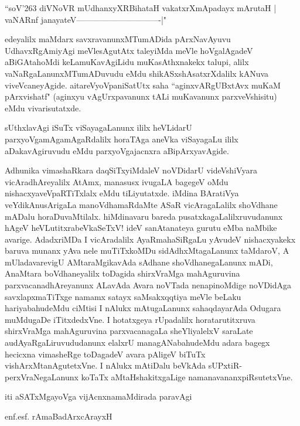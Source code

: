 \begin{shloka}
``soV\char'263 diVNoVR mUdhanxyXRBihataH vakatxrXmApadayx mArutaH |\\
vaNARnf janayateV-------------------------------|"
\end{shloka}

edeyalilx maMdarx savxravanunxMTumADida pArxNavAyuvu UdhavxRgAmiyAgi meVlesAgutAtx taleyiMda meVle hoVgalAgadeV aBiGAtahoMdi keLamuKavAgiLidu muKasAthxnakekx talupi, alilx vaNaRgaLanunxMTumADuvudu eMdu shikASxshAsatxrXdalilx kANuva viveVcaneyAgide. aitareVyoVpaniSatUtx saha ``aginxvARgUBxtAvx muKaM pArxvishatf" (aginxyu vAgUrxpavanunx tALi muKavanunx parxveVshisitu) eMdu vivarisutatxde.

sUthxlavAgi iSuTx viSayagaLanunx ililx heVLidarU parxyoVgamAgamAgaRdalilx horaTAga aneVka viSayagaLu ililx aDakavAgiruvudu eMdu parxyoVgajacnxra aBipArxyavAgide.

Adhunika vimashaRkara daqSiTxyiMdaleV noVDidarU videVshiVyara vicAradhAreyalilx AtAmx, manasusx ivugaLA bagegeV oMdu nishacxyaveVpaRTiTxlalx eMdu tiLiyutatxde. iMdina BAratiVya veYdikAnusArigaLa manoVdhamaRdaMte ASaR vicAragaLalilx shoVdhane mADalu horaDuvaMtilalx. hiMdinavaru bareda pusatxkagaLalilxruvudanunx hAgeV heVLutitxrabeVkaSeTxV! ideV sanAtanateya gurutu eMba naMbike avarige. AdadxriMDa I vicAradalilx AyaRmahaSiRgaLu yAvudeV nishacxyakekx baruva munanx yAva nele muTiTxkoMDu sidAdhxMtagaLanunx taMdaroV, A mUladavarevigU AMtaraMgikavAda sAdhane shoVdhanegaLanunx mADi, AnaMtara boVdhaneyalilx toDagida shirxVraMga mahAguruvina parxvacanadhAreyanunx ALavAda Avara noVTada nenapinoMdige noVDidAga savxlapxmaTiTxge namamx satayx saMsakxqqtiya meVle beLaku hariyabahudeMdu ciMtisi I nAlukx mAtugaLanunx sahaqdayarAda Odugara muMdugaDe iTitxdedxVne. I hotatxgeya rUpadalilx horatarutitxruva shirxVraMga mahAguruvina parxvacanagaLa sheYliyalelxV saraLate audAyaRgaLiruvududanunx elalxrU managANabahudeMdu adara bagegx hecicxna vimasheRge toDagadeV avara pAligeV biTuTx vishArxMtanAgutetxVne. I nAlukx mAtiDalu beVkAda sUPxtiR-perxVraNegaLanunx koTaTx aMtaHshakitxgaLige namanavananxpiRsutetxVne.


\hfill iti aSATxMgayoVga vijAcnxnamaMdirada paravAgi

\hfill enf.esf. rAmaBadArxcArayxH

